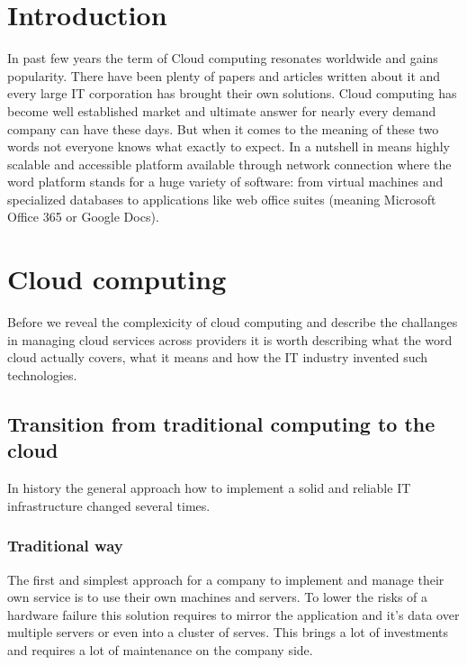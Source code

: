
\chapter{Introduction}
\label{chap:Introduction}
In past few years the term of Cloud computing resonates worldwide and gains popularity. There have been plenty of papers and articles written about it and
every large IT corporation has brought their own solutions. Cloud computing has become well established market and ultimate answer for nearly every demand
company can have these days. But when it comes to the meaning of these two words not everyone knows what exactly to expect. In a nutshell in means highly scalable and accessible platform available through network connection where the word platform stands for a huge variety of software: from virtual machines and specialized databases to applications like web office suites (meaning Microsoft Office 365 or Google Docs).

\chapter{Cloud computing}
\label{chap:Cloud computing}
Before we reveal the complexicity of cloud computing and describe the challanges in managing cloud services across providers it is worth describing what the word cloud actually covers, what it means and how the IT industry invented such technologies.

\section{Transition from traditional computing to the cloud}
\label{sec:Transition from traditional computing to the cloud}

In history the general approach how to implement a solid and reliable IT infrastructure changed several times.

\subsection{Traditional way}
\label{sub:Traditional way}

The first and simplest approach for a company to implement and manage their own service is to use their own machines and servers. To lower the risks of a hardware failure this solution requires to mirror the application and it's data over multiple servers or even into a cluster of serves. This brings a lot of investments and requires a lot of maintenance on the company side.

